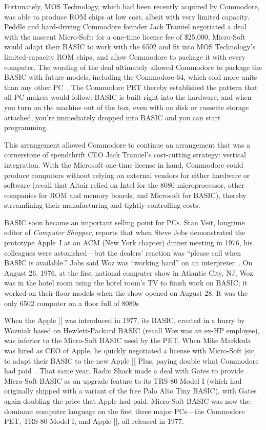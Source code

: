Fortunately, MOS Technology, which had been recently acquired by
Commodore, was able to produce ROM chips at low cost, albeit with very
limited capacity.
Peddle and hard-driving Commodore founder Jack Tramiel negotiated a
deal with the nascent Micro-Soft:
for a one-time license fee of \$25,000,
Micro-Soft would adapt their BASIC to work with the 6502 and
fit into MOS Technology's limited-capacity ROM chips, 
and allow Commodore to package it with every computer.
The wording of the deal ultimately allowed Commodore to package the
BASIC with future models, including the Commodore 64, which sold more units than
any other PC~\cite{commodore}.
The Commodore
PET thereby established the pattern that all PC makers would follow:
BASIC is built right into the hardware, and when you turn on the
machine out of the box, even with no disk or cassette storage attached, you're
immediately dropped into BASIC and you can start programming.

This arrangement allowed Commodore to continue an arrangement that was a
cornerstone of spendthrift CEO Jack Tramiel's cost-cutting strategy:
vertical integration.
With the Microsoft one-time license in hand, Commodore could produce
computers without relying on external vendors for either hardware or
software (recall that Altair relied on Intel for the 8080
microprocessor, other companies for ROM and memory boards, and Microsoft
for BASIC), thereby streamlining their manufacturing and tightly
controlling costs.

BASIC soon became an important selling point for PCs.  Stan Veit,
longtime editor of \emph{Computer Shopper}, reports 
that when Steve Jobs demonstrated the prototype Apple~I at an ACM (New
York chapter) dinner meeting in 1976, his colleagues were
astonished---but the dealers' reaction was ``please call when BASIC is
available.''  Jobs said Woz was ``working hard'' on an
interpreter~\cite[pp. 92ff]{veit}.
On August 26, 1976, at the first national computer show in Atlantic City,
NJ, Woz was in the hotel room using the hotel room's TV to finish work
on BASIC; it worked on their floor models when the show opened on August
28.  It was the only 6502 computer on a floor full of 8080s

When the Apple ][ was introduced in 1977, its BASIC, created in a hurry
by Wozniak based on Hewlett-Packard BASIC (recall Woz was an ex-HP
employee), was inferior to the Micro-Soft BASIC used by the PET.
When Mike Markkula was hired as CEO of Apple, he quickly negotiated a
license with Micro-Soft [sic] to adapt their BASIC to the new Apple ][ Plus,
paying double what Commodore had paid~\cite[p. 114]{commodore}.
That same year, Radio Shack made a deal with Gates to provide
Micro-Soft BASIC as an upgrade feature to its TRS-80 Model I (which
had originally shipped with a variant of the free Palo Alto Tiny
BASIC), with Gates again doubling the price that Apple had paid.
Micro-Soft BASIC was now the dominant computer language on the first
three major PCs---the Commodore PET, TRS-80 Model I, and Apple
][, all released in 1977.

